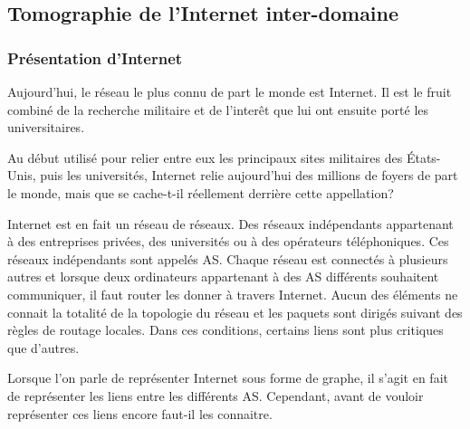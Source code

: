 
% 

\subsection{Tomographie de l'Internet inter-domaine}

\subsubsection{Pr\'esentation d'Internet}

\par
Aujourd'hui, le r\'eseau le plus connu de part le monde est Internet. Il est le fruit combin\'e de la recherche militaire et de l'inter\^et que lui ont ensuite port\'e les universitaires.
\par
Au d\'ebut utilis\'e pour relier entre eux les principaux sites militaires des \'Etats-Unis, puis les universit\'es, Internet relie aujourd'hui des millions de foyers de part le monde, mais que se cache-t-il r\'eellement derri\`ere cette appellation?
\par
Internet est en fait un r\'eseau de r\'eseaux. Des r\'eseaux ind\'ependants appartenant \`a des entreprises priv\'ees, des universit\'es ou à des op\'erateurs t\'el\'ephoniques. Ces r\'eseaux ind\'ependants sont appel\'es AS. Chaque r\'eseau est connect\'es \`a plusieurs autres et lorsque deux ordinateurs appartenant \`a des AS diff\'erents souhaitent communiquer, il faut router les donner \`a travers Internet. Aucun des \'el\'ements ne connait la totalit\'e de la topologie du r\'eseau et les paquets sont dirig\'es suivant des r\`egles de routage locales. Dans ces conditions, certains liens sont plus critiques que d'autres.
\par
Lorsque l'on parle de repr\'esenter Internet sous forme de graphe, il s'agit en fait de repr\'esenter les liens entre les diff\'erents AS. Cependant, avant de vouloir repr\'esenter ces liens encore faut-il les connaitre.

